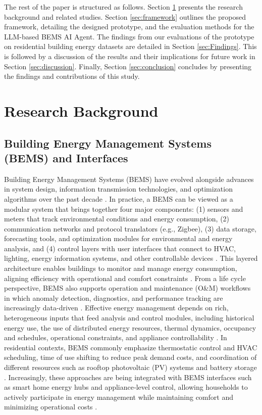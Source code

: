 \documentclass[final,3p,times]{elsarticle}
\begin{document}
The rest of the paper is structured as follows. Section \ref{sec:LR} presents the research background and related studies. Section \ref{sec:framework} outlines the proposed framework, detailing the designed prototype, and the evaluation methods for the LLM-based BEMS AI Agent. The findings from our evaluations of the prototype on residential building energy datasets are detailed in Section \ref{sec:Findings}. This is followed by a discussion of the results and their implications for future work in Section \ref{sec:discussion}. Finally, Section \ref{sec:conclusion} concludes by presenting the findings and contributions of this study.

\section{Research Background}
\label{sec:LR}

\subsection{Building Energy Management Systems (BEMS) and Interfaces}

Building Energy Management Systems (BEMS) have evolved alongside advances in system design, information transmission technologies, and optimization algorithms over the past decade \cite{mariano2021review,han2023home}. In practice, a BEMS can be viewed as a modular system that brings together four major components: (1) sensors and meters that track environmental conditions and energy consumption, (2) communication networks and protocol translators (e.g., Zigbee), (3) data storage, forecasting tools, and optimization modules for environmental and energy analysis, and (4) control layers with user interfaces that connect to HVAC, lighting, energy information systems, and other controllable devices \cite{manic2016building,mahapatra2022home}. This layered architecture enables buildings to monitor and manage energy consumption, aligning efficiency with operational and comfort constraints \cite{mahapatra2022home,han2023home}. From a life cycle perspective, BEMS also supports operation and maintenance (O\&M) workflows in which anomaly detection, diagnostics, and performance tracking are increasingly data-driven \cite{chen2023review}. Effective energy management depends on rich, heterogeneous inputs that feed analysis and control modules, including historical energy use, the use of distributed energy resources, thermal dynamics, occupancy and schedules, operational constraints, and appliance controllability \cite{luo2019optimal,mariano2021review}. In residential contexts, BEMS commonly emphasize thermostatic control and HVAC scheduling, time of use shifting to reduce peak demand costs, and coordination of different resources such as rooftop photovoltaic (PV) systems and battery storage \cite{badar2022smart}. Increasingly, these approaches are being integrated with BEMS interfaces such as smart home energy hubs and appliance‐level control, allowing households to actively participate in energy management while maintaining comfort and minimizing operational costs \cite{blonsky2022home}.
\end{document}
